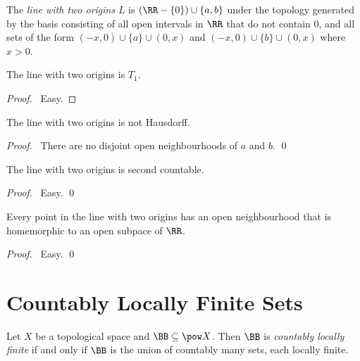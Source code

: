 \begin{definition}
    The \emph{line with two origins} $L$ is $(\RR - \{0\}) \cup \{a,b\}$ under the topology
    generated by the basis consisting of all open intervals in $\RR$ that do not contain $0$,
    and all sets of the form $(-x,0) \cup \{ a \} \cup (0,x)$ and $(-x,0) \cup \{b\} \cup (0,x)$
    where $x > 0$.
\end{definition}

\begin{proposition}
    The line with two origins is $T_1$.
\end{proposition}

\begin{proof}
    \pf\ Easy.
\end{proof}

\begin{proposition}
    The line with two origins is not Hausdorff.
\end{proposition}

\begin{proof}
    \pf\ There are no disjoint open neighbourhoods of $a$ and $b$. \qed
\end{proof}

\begin{proposition}
    The line with two origins is second countable.
\end{proposition}

\begin{proof}
    \pf\ Easy. \qed
\end{proof}

\begin{proposition}
    Every point in the line with two origins has an open neighbourhood that is homemorphic to an open subpace of $\RR$.
\end{proposition}

\begin{proof}
    \pf\ Easy. \qed
\end{proof}

\section{Countably Locally Finite Sets}

\begin{definition}
    Let $X$ be a topological space and $\BB \subseteq \pow X$. Then $\BB$ is \emph{countably locally finite} if and only if
    $\BB$ is the union of countably many sets, each locally finite.
\end{definition}

